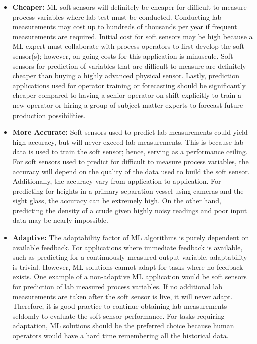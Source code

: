 \begin{itemize}
    \item \textbf{Cheaper: } ML soft sensors will definitely be cheaper for difficult-to-measure process variables where lab test must be conducted.  Conducting lab measurements may cost up to hundreds of thousands per year if frequent measurements are required.  Initial cost for soft sensors may be high because a ML expert must collaborate with process operators to first develop the soft sensor(s); however, on-going costs for this application is minuscule.  Soft sensors for prediction of variables that are difficult to measure are definitely cheaper than buying a highly advanced physical sensor.  Lastly, prediction applications used for operator training or forecasting should be significantly cheaper compared to having a senior operator on shift explicitly to train a new operator or hiring a group of subject matter experts to forecast future production possibilities.
    \item \textbf{More Accurate: } Soft sensors used to predict lab measurements could yield high accuracy, but will never exceed lab measurements.  This is because lab data is used to train the soft sensor; hence, serving as a performance ceiling.  For soft sensors used to predict for difficult to measure process variables, the accuracy will depend on the quality of the data used to build the soft sensor.  Additionally, the accuracy vary from application to application.  For predicting for heights in a primary separation vessel using cameras and the sight glass, the accuracy can be extremely high.  On the other hand, predicting the density of a crude given highly noisy readings and poor input data may be nearly impossible.
    \item \textbf{Adaptive: } The adaptability factor of ML algorithms is purely dependent on available feedback.  For applications where immediate feedback is available, such as predicting for a continuously measured output variable, adaptability is trivial.  However, ML solutions cannot adapt for tasks where no feedback exists.  One example of a non-adaptive ML application would be soft sensors for prediction of lab measured process variables. If no additional lab measurements are taken after the soft sensor is live, it will never adapt.  Therefore, it is good practice to continue obtaining lab measurements seldomly to evaluate the soft sensor performance. For tasks requiring adaptation, ML solutions should be the preferred choice because human operators would have a hard time remembering all the historical data.
\end{itemize}

